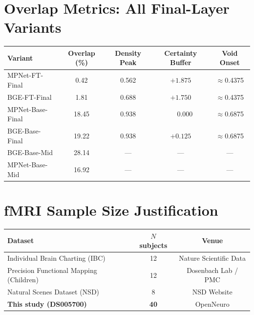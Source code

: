 \documentclass{article}
\begin{document}
\section{Overlap Metrics: All Final-Layer Variants}
\label{app:overlap}

\begin{center}
\small
\begin{tabular}{lcccc}
\toprule
Variant & Overlap (\%) & Density Peak & Certainty Buffer & Void Onset \\
\midrule
MPNet-FT-Final   & 0.42  & 0.562 & $+1.875$ & $\approx$0.4375 \\
BGE-FT-Final     & 1.81  & 0.688 & $+1.750$ & $\approx$0.4375 \\
MPNet-Base-Final & 18.45 & 0.938 & $\phantom{+}0.000$ & $\approx$0.6875 \\
BGE-Base-Final   & 19.22 & 0.938 & $+0.125$ & $\approx$0.6875 \\
BGE-Base-Mid     & 28.14 &  ---  &    ---   &    ---    \\
MPNet-Base-Mid   & 16.92 &  ---  &    ---   &    ---    \\
\bottomrule
\end{tabular}
\end{center}

\section{fMRI Sample Size Justification}
\label{app:sample-size}

\begin{center}
\small
\begin{tabular}{lcc}
\toprule
Dataset & $N$ subjects & Venue \\
\midrule
Individual Brain Charting (IBC)         & 12 & Nature Scientific Data \\
Precision Functional Mapping (Children) & 12 & Dosenbach Lab / PMC \\
Natural Scenes Dataset (NSD)            & 8  & NSD Website \\
\textbf{This study (DS005700)}          & \textbf{40} & OpenNeuro \\
\bottomrule
\end{tabular}
\end{center}
\end{document}

